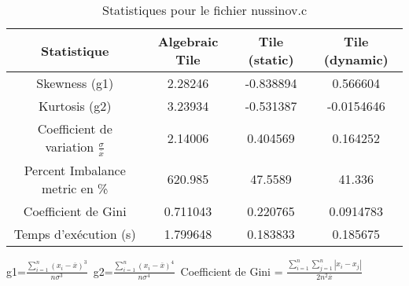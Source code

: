 \documentclass{article}
\begin{document}
\begin{table}[htbp]
  \centering
  \caption{Statistiques pour le fichier nussinov.c}
  \begin{tabular}{|c|c|c|c|}
    \hline
    Statistique & Algebraic Tile & Tile (static) & Tile (dynamic) \\ 
    \hline
    Skewness (g1)  & 2.28246 & -0.838894 & 0.566604 \\ 
    Kurtosis (g2)  & 3.23934 & -0.531387 & -0.0154646 \\ 
    Coefficient de variation $ \frac{\sigma}{\overline{x}} $ & 2.14006 & 0.404569 & 0.164252\\ 
    Percent Imbalance metric en \% & 620.985 & 47.5589 & 41.336\\ 
    Coefficient de Gini  & 0.711043 & 0.220765 & 0.0914783\\ 
    Temps d'exécution (s) &  1.799648    &  0.183833   &  0.185675   \\ 

    \hline
  \end{tabular}
\end{table}
g1=$ \frac{\sum_{i=1}^{n} (x_i - \overline{x})^3}{n\sigma^3} $\
g2=$ \frac{\sum_{i=1}^{n} (x_i - \overline{x})^4}{n\sigma^4} $\
Coefficient de Gini = $ \frac{\sum_{i=1}^{n}\sum_{j=1}^{n} |x_i - x_j|}{2n^2\overline{x}} $\
\newpage
\end{document}

